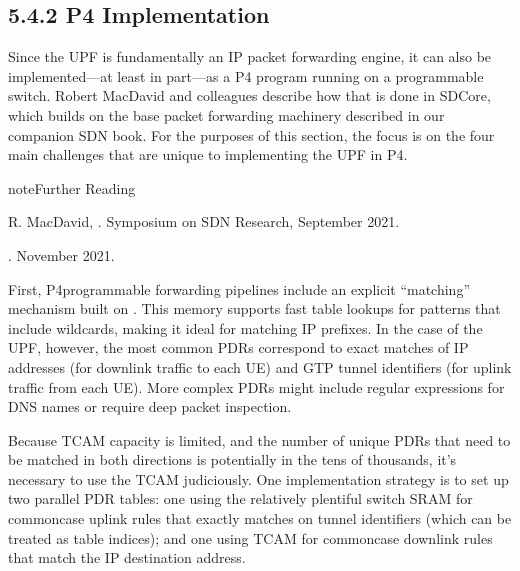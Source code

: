 \documentclass[a4paper,11pt,english]{sphinxmanual}
\begin{document}
\subsection{5.4.2 P4 Implementation}
\label{\detokenize{core:p4-implementation}}
\sphinxAtStartPar
Since the UPF is fundamentally an IP packet forwarding engine, it can
also be implemented—at least in part—as a P4 program running on a
programmable switch. Robert MacDavid and colleagues describe how that
is done in SD\sphinxhyphen{}Core, which builds on the base packet forwarding
machinery described in our companion SDN book. For the purposes of
this section, the focus is on the four main challenges that are unique
to implementing the UPF in P4.

\label{\detokenize{core:reading-p4-upf}}
\begin{sphinxadmonition}{note}{Further Reading}

\sphinxAtStartPar
R. MacDavid,  .
Symposium on SDN Research, September 2021.

\sphinxAtStartPar
{}.  November 2021.
\end{sphinxadmonition}

\sphinxAtStartPar
First, P4\sphinxhyphen{}programmable forwarding pipelines include an explicit
“matching” mechanism built on . This memory supports fast table lookups for patterns that
include wildcards, making it ideal for matching IP prefixes. In the
case of the UPF, however, the most common PDRs correspond to exact
matches of IP addresses (for downlink traffic to each UE) and GTP
tunnel identifiers (for uplink traffic from each UE). More complex
PDRs might include regular expressions for DNS names or require deep
packet inspection.

\sphinxAtStartPar
Because TCAM capacity is limited, and the number of unique PDRs that
need to be matched in both directions is potentially in the tens of
thousands, it’s necessary to use the TCAM judiciously. One
implementation strategy is to set up two parallel PDR tables: one
using the relatively plentiful switch SRAM for common\sphinxhyphen{}case uplink
rules that exactly matches on tunnel identifiers (which can be treated
as table indices); and one using TCAM for common\sphinxhyphen{}case downlink rules
that match the IP destination address.
\end{document}
